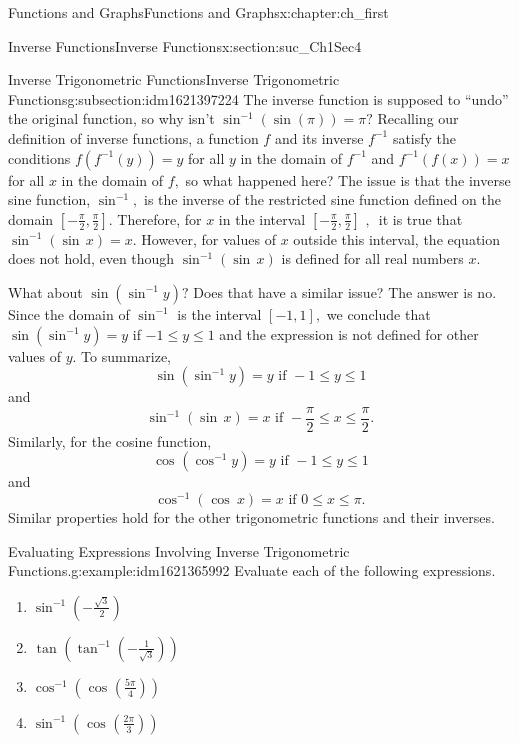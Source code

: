 \documentclass[oneside,10pt,]{book}
\numberwithin{equation}{section}
\begin{document}
\begin{chapterptx}{Functions and Graphs}{}{Functions and Graphs}{}{}{x:chapter:ch_first}
\begin{sectionptx}{Inverse Functions}{}{Inverse Functions}{}{}{x:section:suc_Ch1Sec4}
\begin{subsectionptx}{Inverse Trigonometric Functions}{}{Inverse Trigonometric Functions}{}{}{g:subsection:idm1621397224}
The inverse function is supposed to “undo” the original function, so why isn’t \(\sin^{-1} (\sin(\pi))=\pi?\) Recalling our definition of inverse functions, a function \(f\) and its inverse \(f^{-1} \) satisfy the conditions \(f(f^{-1} (y))=y\) for all \(y\) in the domain of \(f^{-1} \) and \(f^{-1} (f(x))=x\) for all \(x\) in the domain of \(f,\) so what happened here? The issue is that the inverse sine function, \(\sin^{-1} ,\) is the inverse of the restricted sine function defined on the domain \([-\frac{\pi}{2},\frac{\pi}{2}].\) Therefore, for \(x\) in the interval \([-\frac{\pi}{2},\frac{\pi}{2}]\text{ , }\) it is true that \(\sin^{-1} (\sin\,x)=x.\) However, for values of \(x\) outside this interval, the equation does not hold, even though \(\sin^{-1} (\sin\,x)\) is defined for all real numbers \(x.\)%
\par
What about \(\sin(\sin^{-1} y)?\) Does that have a similar issue? The answer is no. Since the domain of \(\sin^{-1} \) is the interval \([-1,1],\) we conclude that \(\sin(\sin^{-1} y)=y\) if \(-1\leq  y\leq  1\) and the expression is not defined for other values of \(y.\) To summarize,%
%
\begin{equation*}
\sin(\sin^{-1} y)=y \text{ if } -1\leq  y\leq  1
\end{equation*}
and%
%
\begin{equation*}
\sin^{-1} (\sin\,x)=x \text{ if } -\frac{\pi}{2}\leq  x\leq  \frac{\pi}{2}.
\end{equation*}
Similarly, for the cosine function,%
%
\begin{equation*}
\text{ cos }(\cos^{-1}y)=y \text{ if } -1\leq  y\leq  1
\end{equation*}
and%
%
\begin{equation*}
\cos^{-1}(\text{ cos }\,x)=x \text{ if } 0\leq  x\leq  \pi.
\end{equation*}
Similar properties hold for the other trigonometric functions and their inverses.%
\begin{example}{Evaluating Expressions Involving Inverse Trigonometric Functions.}{g:example:idm1621365992}%
Evaluate each of the following expressions.%
%
\begin{enumerate}
\item{}\(\displaystyle \sin^{-1} (- \frac{\sqrt{3}}{2})\)%
\item{}\(\displaystyle \text{ tan }(\tan^{-1} (- \frac{1}{\sqrt{3}}))\)%
\item{}\(\displaystyle \cos^{-1}(\text{ cos }( \frac{5\pi}{4}))\)%
\item{}\(\displaystyle \sin^{-1} (\text{ cos }( \frac{2\pi}{3}))\)%

\end{enumerate}
\end{example}
\end{subsectionptx}
\end{sectionptx}
\end{chapterptx}
\end{document}
